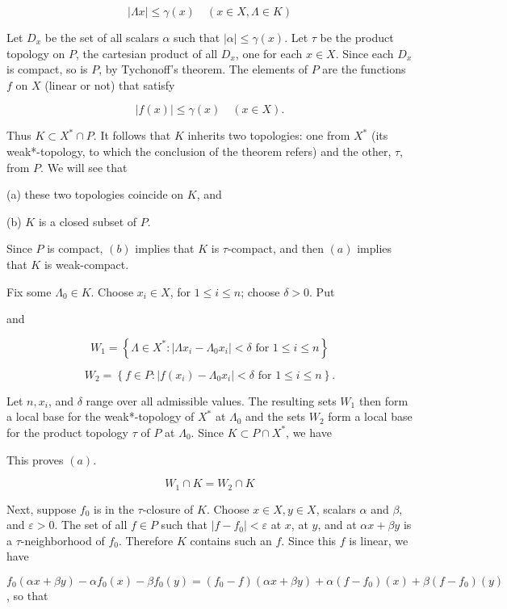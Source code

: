 \documentclass[10pt]{article}
\begin{document}
$$
|\Lambda x| \leq \gamma(x) \quad(x \in X, \Lambda \in K)
$$

Let $D_{x}$ be the set of all scalars $\alpha$ such that $|\alpha| \leq \gamma(x)$. Let $\tau$ be the product topology on $P$, the cartesian product of all $D_{x}$, one for each $x \in X$. Since each $D_{x}$ is compact, so is $P$, by Tychonoff's theorem. The elements of $P$ are the functions $f$ on $X$ (linear or not) that satisfy

$$
|f(x)| \leq \gamma(x) \quad(x \in X) .
$$

Thus $K \subset X^{*} \cap P$. It follows that $K$ inherits two topologies: one from $X^{*}$ (its weak*-topology, to which the conclusion of the theorem refers) and the other, $\tau$, from $P$. We will see that

(a) these two topologies coincide on $K$, and

(b) $K$ is a closed subset of $P$.

Since $P$ is compact, $(b)$ implies that $K$ is $\tau$-compact, and then $(a)$ implies that $K$ is weak-compact.

Fix some $\Lambda_{0} \in K$. Choose $x_{i} \in X$, for $1 \leq i \leq n$; choose $\delta>0$. Put

and

$$
W_{1}=\left\{\Lambda \in X^{*}:\left|\Lambda x_{i}-\Lambda_{0} x_{i}\right|<\delta \text { for } 1 \leq i \leq n\right\}
$$

$$
W_{2}=\left\{f \in P:\left|f\left(x_{i}\right)-\Lambda_{0} x_{i}\right|<\delta \text { for } 1 \leq i \leq n\right\} .
$$

Let $n, x_{i}$, and $\delta$ range over all admissible values. The resulting sets $W_{1}$ then form a local base for the weak*-topology of $X^{*}$ at $\Lambda_{0}$ and the sets $W_{2}$ form a local base for the product topology $\tau$ of $P$ at $\Lambda_{0}$. Since $K \subset P \cap X^{*}$, we have

This proves $(a)$.

$$
W_{1} \cap K=W_{2} \cap K
$$

Next, suppose $f_{0}$ is in the $\tau$-closure of $K$. Choose $x \in X, y \in X$, scalars $\alpha$ and $\beta$, and $\varepsilon>0$. The set of all $f \in P$ such that $\left|f-f_{0}\right|<\varepsilon$ at $x$, at $y$, and at $\alpha x+\beta y$ is a $\tau$-neighborhood of $f_{0}$. Therefore $K$ contains such an $f$. Since this $f$ is linear, we have

$f_{0}(\alpha x+\beta y)-\alpha f_{0}(x)-\beta f_{0}(y)=\left(f_{0}-f\right)(\alpha x+\beta y)+\alpha\left(f-f_{0}\right)(x)+\beta\left(f-f_{0}\right)(y)$, so that
\end{document}
